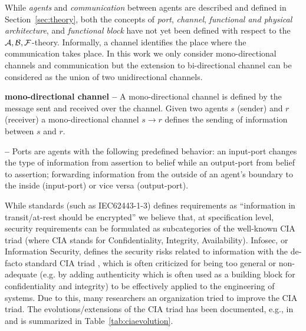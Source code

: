 While \emph{agents} and \emph{communication} between agents are described and
defined in Section~\ref{sec:theory}, both the concepts of \emph{port},
\emph{channel}, \emph{functional and physical architecture}, and
\emph{functional block} have not yet been defined with respect to the $\mathcal{A},\mathcal{B},\mathcal{F}$-theory.
Informally, a channel identifies the place where the communication takes place.
In this work we only consider mono-directional channels and communication but the 
extension to bi-directional channel can be considered as the union of two
unidirectional channels. 

\begin{definition}{\bf mono-directional channel --}\label{def:monochannel}
	A mono-directional channel is defined by the message sent and received
	over the channel. Given two agents $s$ (sender) and $r$ (receiver) a
	mono-directional channel $s \rightarrow r$ defines the sending of
	information between $s$ and $r$. 
\end{definition}

\begin{definition}{\bf {} --}\label{def:port} 
	Ports are agents with the following predefined behavior: an input-port
	changes the type of information from assertion to belief while an
	output-port from belief to assertion; forwarding information from the
	outside of an agent's boundary to the inside (input-port) or vice versa
	(output-port).
\end{definition}

While standards (such
as IEC62443-1-3) defines requirements as
``information in transit/at-rest should be encrypted'' we believe that, at
specification level, security requirements can be formulated as subcategories of
the well-known CIA triad (where CIA stands for Confidentiality, Integrity,
Availability).
Infosec, or Information Security, defines the security risks related to
information with the de-facto standard CIA triad , which is often criticized
\autocite{CIAcriticismCPS} for being too general or non-adequate (e.g. by
adding authenticity which is often used as a building block for confidentiality
and integrity) to be effectively applied to the engineering of systems. Due to
this, many researchers an organization tried to improve the CIA triad.  The
evolutions/extensions of the CIA triad has been documented, e.g., in
\autocite{Samonas2014cia} and is summarized in Table~\ref{tab:ciaevolution}.

